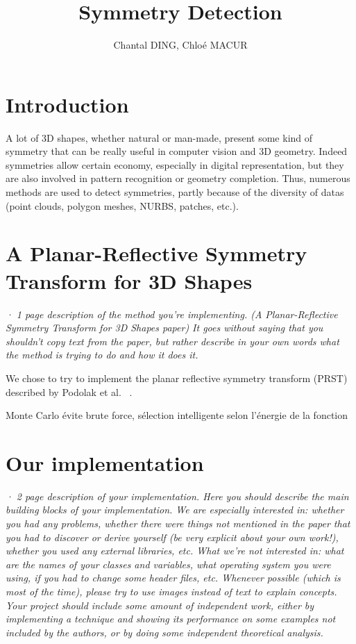 \documentclass[10pt,a4paper]{article}			%
\title{Symmetry Detection}
\author{Chantal DING, Chloé MACUR}
\begin{document}


\newpage
\tableofcontents

\newpage
	
	\section*{Introduction}
  
	A lot of 3D shapes, whether natural or man-made, present some kind of symmetry that can be really useful in computer vision and 3D geometry.  Indeed symmetries allow certain economy, especially in digital representation, but they are also involved in pattern recognition or geometry completion. Thus, numerous methods are used to detect symmetries, partly because of the diversity of datas (point clouds, polygon meshes, NURBS, patches, etc.).  
 
	\section{A Planar-Reflective Symmetry Transform for 3D Shapes}
	
	\textit{· 1 page description of the method you're implementing. (A Planar-Reflective Symmetry Transform for 3D Shapes paper) It goes without saying that you shouldn't copy text from the paper, but rather describe in your own words what the method is trying to do and how it does it. \\}
	
	We chose to try to implement the planar reflective symmetry transform (PRST) described by Podolak et al. ~\cite{Podolak:2006:APS}.
	
	Monte Carlo évite brute force, sélection intelligente selon l'énergie de la fonction
	
	\section{Our implementation}
	
	\textit{· 2 page description of your implementation. Here you should describe the main building blocks of your implementation. We are especially interested in: whether you had any problems, whether there were things not mentioned in the paper that you had to discover or derive yourself (be very explicit about your own work!), whether you used any external libraries, etc. What we're not interested in: what are the names of your classes and variables, what operating system you were using, if you had to change some header files, etc. Whenever possible (which is most of the time), please try to use images instead of text to explain concepts.\\
	Your project should include some amount of independent work, either by implementing a technique and showing its performance on some examples not included by the authors, or by doing some independent theoretical analysis.\\}
\end{document}

